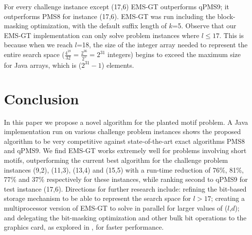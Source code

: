 \documentclass{acm_proc_article-sp}
\begin{document}
		
		For every challenge instance except (17,6) EMS-GT outperforms qPMS9; it outperforms PMS8 for instance (17,6). EMS-GT was run including the block-masking optimization, with the default suffix length of $k$=5. Observe that our EMS-GT implementation can only solve problem instances where $l \leq 17$. This is because when we reach $l$=18, the size of the integer array needed to represent the entire search space ($\frac{4^{18}}{32} = \frac{2^{36}}{2^{5}} = 2^{31}$ integers) begins to exceed the maximum size for Java arrays, which is ($2^{31} - 1$) elements.\newline





\section{Conclusion}
	In this paper we propose a novel algorithm for the planted motif problem. A Java implementation run on various challenge problem instances shows the proposed algorithm to be very competitive against state-of-the-art exact algorithms PMS8 and qPMS9. We find EMS-GT works extremely well for problems involving short motifs, outperforming the current best algorithm for the challenge problem instances (9,2), (11,3), (13,4) and (15,5) with a run-time reduction of 76\%, 81\%, 77\% and 37\% respectively for these instances, 
	while ranking second to qPMS9 for test instance (17,6). Directions for further research include: refining the bit-based storage mechanism to be able to represent the search space for $l > 17$; creating a multiprocessor version of EMS-GT to solve in parallel for larger values of ($l$,$d$); and delegating the bit-masking optimization and other bulk bit operations to the graphics card, as explored in \cite{dasari2010efficient}, for faster performance.

\newpage


\end{document}
